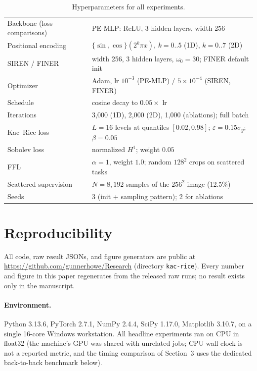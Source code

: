 \documentclass[10pt]{article}
\begin{document}
\begin{table}[h]
\centering
\caption{Hyperparameters for all experiments.}
\begin{tabular}{ll}
\toprule
Backbone (loss comparisons) & PE-MLP: ReLU, 3 hidden layers, width 256 \\
Positional encoding & $\{\sin,\cos\}(2^k\pi x)$, $k=0..5$ (1D), $k=0..7$ (2D) \\
SIREN / FINER & width 256, 3 hidden layers, $\omega_0=30$; FINER default init \\
Optimizer & Adam, lr $10^{-3}$ (PE-MLP) / $5\times10^{-4}$ (SIREN, FINER) \\
Schedule & cosine decay to $0.05\times$ lr \\
Iterations & 3{,}000 (1D), 2{,}000 (2D), 1{,}000 (ablations); full batch \\
Kac--Rice loss & $L=16$ levels at quantiles $[0.02,0.98]$; $\varepsilon=0.15\sigma_y$; $\beta=0.05$ \\
Sobolev loss & normalized $H^1$; weight $0.05$ \\
FFL & $\alpha=1$, weight $1.0$; random $128^2$ crops on scattered tasks \\
Scattered supervision & $N=8{,}192$ samples of the $256^2$ image (12.5\%) \\
Seeds & 3 (init + sampling pattern); 2 for ablations \\
\bottomrule
\end{tabular}
\end{table}

\section{Reproducibility}
\label{app:repro}

All code, raw result JSONs, and figure generators are public at
\url{https://github.com/gunnerhowe/Research} (directory \texttt{kac-rice}).
Every number and figure in this paper regenerates from the released raw runs;
no result exists only in the manuscript.

\paragraph{Environment.} Python 3.13.6, PyTorch 2.7.1, NumPy 2.4.4, SciPy
1.17.0, Matplotlib 3.10.7, on a single 16-core Windows workstation. All
headline experiments ran on CPU in float32 (the machine's GPU was shared with
unrelated jobs; CPU wall-clock is not a reported metric, and the timing
comparison of Section~3 uses the dedicated back-to-back benchmark below).
\end{document}
